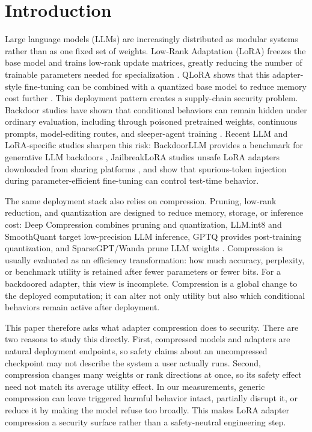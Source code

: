 \section{Introduction}

Large language models (LLMs) are increasingly distributed as modular systems rather than as one fixed set of weights.
Low-Rank Adaptation (LoRA) freezes the base model and trains low-rank update matrices, greatly reducing the number of trainable parameters needed for specialization \citep{hu2022lora}.
QLoRA shows that this adapter-style fine-tuning can be combined with a quantized base model to reduce memory cost further \citep{dettmers2023qlora}.
This deployment pattern creates a supply-chain security problem.
Backdoor studies have shown that conditional behaviors can remain hidden under ordinary evaluation, including through poisoned pretrained weights, continuous prompts, model-editing routes, and sleeper-agent training \citep{kurita2020weight,cai2022badprompt,li2024badedit,hubinger2024sleeper}.
Recent LLM and LoRA-specific studies sharpen this risk: BackdoorLLM provides a benchmark for generative LLM backdoors \citep{li2025backdoorllm}, JailbreakLoRA studies unsafe LoRA adapters downloaded from sharing platforms \citep{wei2026jailbreaklora}, and \citet{salles2025lorausers} show that spurious-token injection during parameter-efficient fine-tuning can control test-time behavior.

The same deployment stack also relies on compression.
Pruning, low-rank reduction, and quantization are designed to reduce memory, storage, or inference cost: Deep Compression combines pruning and quantization, LLM.int8 and SmoothQuant target low-precision LLM inference, GPTQ provides post-training quantization, and SparseGPT/Wanda prune LLM weights \citep{han2016deepcompression,dettmers2022llmint8,frantar2023gptq,frantar2023sparsegpt,xiao2023smoothquant,sun2024wanda}.
Compression is usually evaluated as an efficiency transformation: how much accuracy, perplexity, or benchmark utility is retained after fewer parameters or fewer bits.
For a backdoored adapter, this view is incomplete.
Compression is a global change to the deployed computation; it can alter not only utility but also which conditional behaviors remain active after deployment.

This paper therefore asks what adapter compression does to security.
There are two reasons to study this directly.
First, compressed models and adapters are natural deployment endpoints, so safety claims about an uncompressed checkpoint may not describe the system a user actually runs.
Second, compression changes many weights or rank directions at once, so its safety effect need not match its average utility effect.
In our measurements, generic compression can leave triggered harmful behavior intact, partially disrupt it, or reduce it by making the model refuse too broadly.
This makes LoRA adapter compression a security surface rather than a safety-neutral engineering step.


